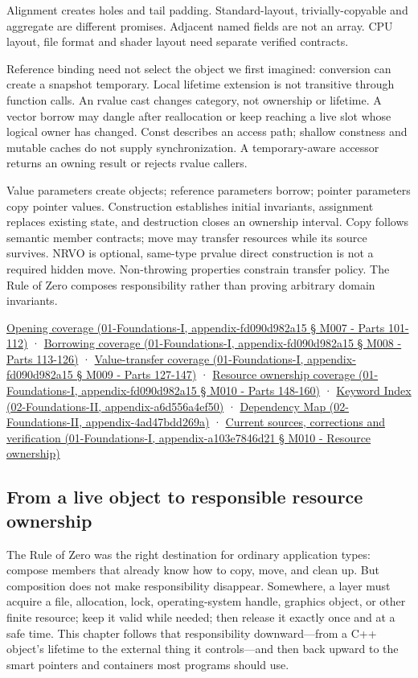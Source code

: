 Alignment creates holes and tail padding. Standard-layout, trivially-copyable and aggregate are different promises. Adjacent named fields are not an array. CPU layout, file format and shader layout need separate verified contracts.

Reference binding need not select the object we first imagined: conversion can create a snapshot temporary. Local lifetime extension is not transitive through function calls. An rvalue cast changes category, not ownership or lifetime. A vector borrow may dangle after reallocation or keep reaching a live slot whose logical owner has changed. Const describes an access path; shallow constness and mutable caches do not supply synchronization. A temporary-aware accessor returns an owning result or rejects rvalue callers.

Value parameters create objects; reference parameters borrow; pointer parameters copy pointer values. Construction establishes initial invariants, assignment replaces existing state, and destruction closes an ownership interval. Copy follows semantic member contracts; move may transfer resources while its source survives. NRVO is optional, same-type prvalue direct construction is not a required hidden move. Non-throwing properties constrain transfer policy. The Rule of Zero composes responsibility rather than proving arbitrary domain invariants.

\href{}{Opening coverage (01-Foundations-I, appendix-fd090d982a15 § M007 - Parts 101-112)} · \href{}{Borrowing coverage (01-Foundations-I, appendix-fd090d982a15 § M008 - Parts 113-126)} · \href{}{Value-transfer coverage (01-Foundations-I, appendix-fd090d982a15 § M009 - Parts 127-147)} · \href{}{Resource ownership coverage (01-Foundations-I, appendix-fd090d982a15 § M010 - Parts 148-160)} · \href{}{Keyword Index (02-Foundations-II, appendix-a6d556a4ef50)} · \href{}{Dependency Map (02-Foundations-II, appendix-4ad47bdd269a)} · \href{}{Current sources, corrections and verification (01-Foundations-I, appendix-a103e7846d21 § M010 - Resource ownership)}

\subsection{From a live object to responsible resource ownership}\label{from-a-live-object-to-responsible-resource-ownership}

The Rule of Zero was the right destination for ordinary application types: compose members that already know how to copy, move, and clean up. But composition does not make responsibility disappear. Somewhere, a layer must acquire a file, allocation, lock, operating-system handle, graphics object, or other finite resource; keep it valid while needed; then release it exactly once and at a safe time. This chapter follows that responsibility downward---from a C++ object's lifetime to the external thing it controls---and then back upward to the smart pointers and containers most programs should use.

